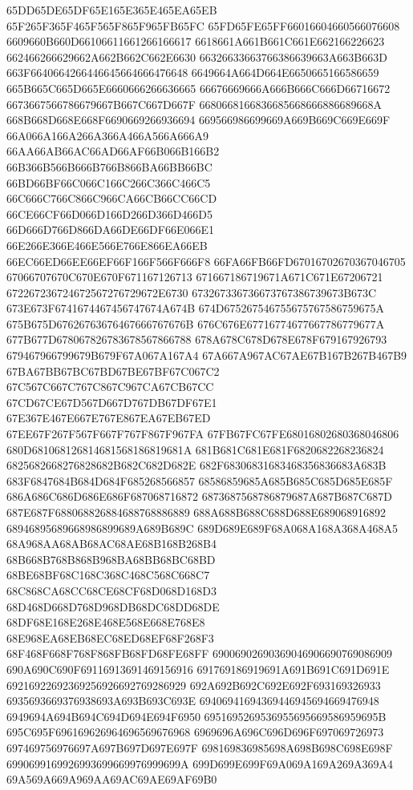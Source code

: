 65DD65DE65DF65E165E365E465EA65EB
65F265F365F465F565F865F965FB65FC
65FD65FE65FF66016604660566076608
6609660B660D66106611661266166617
6618661A661B661C661E662166226623
662466266629662A662B662C662E6630
66326633663766386639663A663B663D
663F6640664266446645664666476648
6649664A664D664E6650665166586659
665B665C665D665E6660666266636665
66676669666A666B666C666D66716672
6673667566786679667B667C667D667F
6680668166836685668666886689668A
668B668D668E668F6690669266936694
669566986699669A669B669C669E669F
66A066A166A266A366A466A566A666A9
66AA66AB66AC66AD66AF66B066B166B2
66B366B566B666B766B866BA66BB66BC
66BD66BF66C066C166C266C366C466C5
66C666C766C866C966CA66CB66CC66CD
66CE66CF66D066D166D266D366D466D5
66D666D766D866DA66DE66DF66E066E1
66E266E366E466E566E766E866EA66EB
66EC66ED66EE66EF66F166F566F666F8
66FA66FB66FD67016702670367046705
67066707670C670E670F671167126713
671667186719671A671C671E67206721
672267236724672567276729672E6730
673267336736673767386739673B673C
673E673F6741674467456747674A674B
674D675267546755675767586759675A
675B675D67626763676467666767676B
676C676E67716774677667786779677A
677B677D678067826783678567866788
678A678C678D678E678F679167926793
679467966799679B679F67A067A167A4
67A667A967AC67AE67B167B267B467B9
67BA67BB67BC67BD67BE67BF67C067C2
67C567C667C767C867C967CA67CB67CC
67CD67CE67D567D667D767DB67DF67E1
67E367E467E667E767E867EA67EB67ED
67EE67F267F567F667F767F867F967FA
67FB67FC67FE68016802680368046806
680D681068126814681568186819681A
681B681C681E681F6820682268236824
6825682668276828682B682C682D682E
682F68306831683468356836683A683B
683F6847684B684D684F685268566857
68586859685A685B685C685D685E685F
686A686C686D686E686F687068716872
6873687568786879687A687B687C687D
687E687F688068826884688768886889
688A688B688C688D688E689068916892
68946895689668986899689A689B689C
689D689E689F68A068A168A368A468A5
68A968AA68AB68AC68AE68B168B268B4
68B668B768B868B968BA68BB68BC68BD
68BE68BF68C168C368C468C568C668C7
68C868CA68CC68CE68CF68D068D168D3
68D468D668D768D968DB68DC68DD68DE
68DF68E168E268E468E568E668E768E8
68E968EA68EB68EC68ED68EF68F268F3
68F468F668F768F868FB68FD68FE68FF
69006902690369046906690769086909
690A690C690F69116913691469156916
691769186919691A691B691C691D691E
69216922692369256926692769286929
692A692B692C692E692F693169326933
6935693669376938693A693B693C693E
69406941694369446945694669476948
6949694A694B694C694D694E694F6950
6951695269536955695669586959695B
695C695F696169626964696569676968
6969696A696C696D696F697069726973
697469756976697A697B697D697E697F
698169836985698A698B698C698E698F
6990699169926993699669976999699A
699D699E699F69A069A169A269A369A4
69A569A669A969AA69AC69AE69AF69B0
